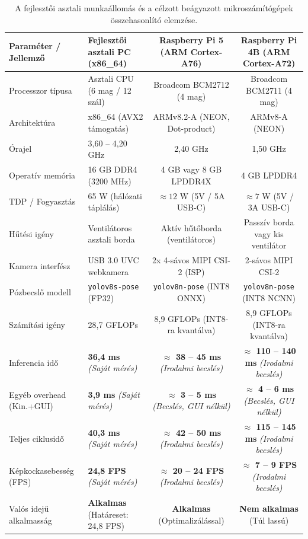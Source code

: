\documentclass[12pt,a4paper,oneside]{report}
\begin{document}
\begin{table}[H]
\centering
\small
\begin{tabularx}{\textwidth}{lXcc}
\toprule
\textbf{Paraméter / Jellemző} & \textbf{Fejlesztői asztali PC (x86\_64)} & \textbf{Raspberry Pi 5 (ARM Cortex-A76)} & \textbf{Raspberry Pi 4B (ARM Cortex-A72)} \\
\midrule
Processzor típusa & Asztali CPU (6 mag / 12 szál) & Broadcom BCM2712 (4 mag) & Broadcom BCM2711 (4 mag) \\
Architektúra & x86\_64 (AVX2 támogatás) & ARMv8.2-A (NEON, Dot-product) & ARMv8-A (NEON) \\
Órajel & 3,60 -- 4,20 GHz & 2,40 GHz & 1,50 GHz \\
Operatív memória & 16 GB DDR4 (3200 MHz) & 4 GB vagy 8 GB LPDDR4X & 4 GB LPDDR4 \\
TDP / Fogyasztás & 65 W (hálózati táplálás) & $\approx 12$ W (5V / 5A USB-C) & $\approx 7$ W (5V / 3A USB-C) \\
Hűtési igény & Ventilátoros asztali borda & Aktív hűtőborda (ventilátoros) & Passzív borda vagy kis ventilátor \\
Kamera interfész & USB 3.0 UVC webkamera & 2x 4-sávos MIPI CSI-2 (ISP) & 2-sávos MIPI CSI-2 \\
Pózbecslő modell & \texttt{yolov8s-pose} (FP32) & \texttt{yolov8n-pose} (INT8 ONNX) & \texttt{yolov8n-pose} (INT8 NCNN) \\
Számítási igény & 28,7 GFLOPs & 8,9 GFLOPs (INT8-ra kvantálva) & 8,9 GFLOPs (INT8-ra kvantálva) \\
\midrule
Inferencia idő & \textbf{36,4 ms} \textit{(Saját mérés)} & \textbf{$\approx$ 38 -- 45 ms} \textit{(Irodalmi becslés)} & \textbf{$\approx$ 110 -- 140 ms} \textit{(Irodalmi becslés)} \\
Egyéb overhead (Kin.+GUI) & \textbf{3,9 ms} \textit{(Saját mérés)} & \textbf{$\approx$ 3 -- 5 ms} \textit{(Becslés, GUI nélkül)} & \textbf{$\approx$ 4 -- 6 ms} \textit{(Becslés, GUI nélkül)} \\
Teljes ciklusidő & \textbf{40,3 ms} \textit{(Saját mérés)} & \textbf{$\approx$ 42 -- 50 ms} \textit{(Irodalmi becslés)} & \textbf{$\approx$ 115 -- 145 ms} \textit{(Irodalmi becslés)} \\
Képkockasebesség (FPS) & \textbf{24,8 FPS} \textit{(Saját mérés)} & \textbf{$\approx$ 20 -- 24 FPS} \textit{(Irodalmi becslés)} & \textbf{$\approx$ 7 -- 9 FPS} \textit{(Irodalmi becslés)} \\
\midrule
Valós idejű alkalmasság & \textbf{Alkalmas} (Határeset: 24,8 FPS) & \textbf{Alkalmas} (Optimalizálással) & \textbf{Nem alkalmas} (Túl lassú) \\
\bottomrule
\end{tabularx}
\caption{A fejlesztői asztali munkaállomás és a célzott beágyazott mikroszámítógépek összehasonlító elemzése.}
\label{tab:hardware_comp}
\end{table}
\end{document}
